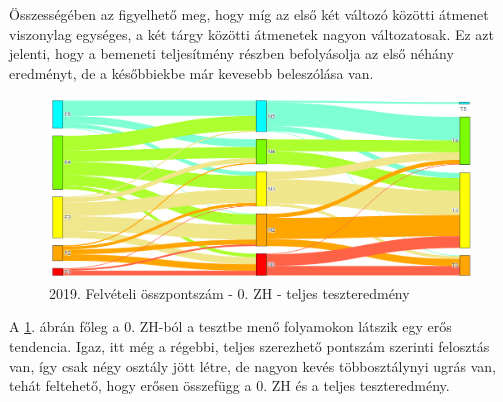 \documentclass[12pt]{article}
\begin{document}
Összességében az figyelhető meg, hogy míg az első két változó közötti átmenet viszonylag egységes, a két tárgy közötti átmenetek nagyon változatosak. Ez azt jelenti, hogy a bemeneti teljesítmény részben befolyásolja az első néhány eredményt, de a későbbiekbe már kevesebb beleszólása van.





\begin{figure}[H]
\centering
\includegraphics[width = \textwidth]{kepek/2019_old_felvi_0zh_teszt.png}
\caption{2019. Felvételi összpontszám - 0. ZH - teljes teszteredmény}
\label{fig:2019_old_felvi_0zh_teszt}
\end{figure}

A \ref{fig:2019_old_felvi_0zh_teszt}. ábrán főleg a 0. ZH-ból a tesztbe menő folyamokon látszik egy erős tendencia. Igaz, itt még a régebbi, teljes szerezhető pontszám szerinti felosztás van, így csak négy osztály jött létre, de nagyon kevés többosztálynyi ugrás van, tehát feltehető, hogy erősen összefügg a 0. ZH és a teljes teszteredmény.
\end{document}
